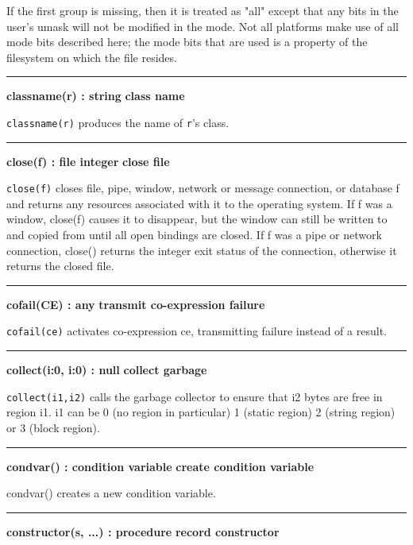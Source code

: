 If the first group is missing, then it is treated as
"all" except that any bits in the
user's umask will not be modified in the mode. Not all
platforms make use of all mode bits described here; the mode bits that
are used is a property of the filesystem on which the file resides.

\bigskip
\hrule\vspace{0.1cm}
\noindent
{\bf classname(r) : string } \hfill {\bf class name}

\noindent
\texttt{classname(r)} produces the name of \texttt{r}'s
class.

\bigskip
\hrule\vspace{0.1cm}
\noindent
{\bf close(f) : file {\textbar} integer } \hfill {\bf close file}

\noindent
{}\texttt{close(f)} closes file, pipe,
window, network or message connection, or database f
and returns any resources associated with it to the operating system.
If f was a window, close(f) causes it to disappear, but the window can
still be written to and copied from until all open bindings are closed.
If f was a pipe or network connection, close() returns the integer exit
status of the connection, otherwise it returns the closed file.

\bigskip
\hrule\vspace{0.1cm}
\noindent
{\bf cofail(CE) : any } \hfill {\bf transmit co-expression failure}

\noindent
{}\texttt{cofail(ce)} activates
co-expression ce, transmitting failure instead of a result.

\bigskip
\hrule\vspace{0.1cm}
\noindent
{\bf collect(i:0, i:0) : null } \hfill {\bf collect garbage}

\noindent
{}\texttt{collect(i1,i2)} calls the
garbage collector to ensure that i2 bytes
are free in region i1. i1 can be 0 (no region in particular)
1 (static region) 2 (string region) or 3 (block region).

\bigskip
\hrule\vspace{0.1cm}
\noindent
{\bf condvar() : condition variable } \hfill {\bf create condition variable}

\noindent
{}condvar() creates
a new condition variable.

\bigskip
\hrule\vspace{0.1cm}
\noindent
{\bf constructor(s, ...) : procedure } \hfill {\bf record constructor}

